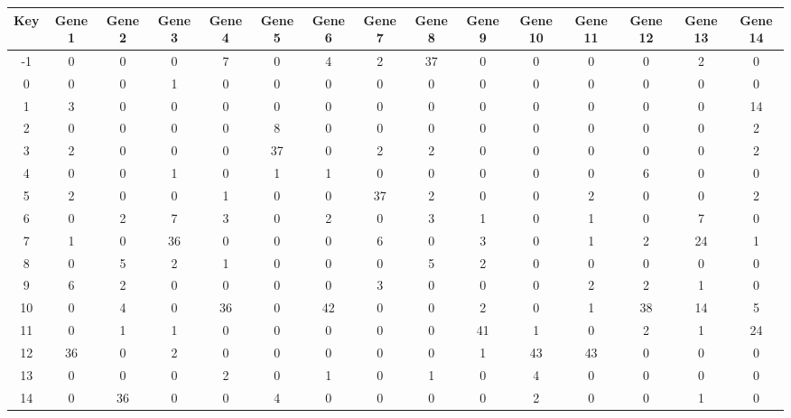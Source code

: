 \begin{tabular}{|c|c|c|c|c|c|c|c|c|c|c|c|c|c|c|}
\hline
Key & Gene 1 & Gene 2 & Gene 3 & Gene 4 & Gene 5 & Gene 6 & Gene 7 & Gene 8 & Gene 9 & Gene 10 & Gene 11 & Gene 12 & Gene 13 & Gene 14 \\
\hline
-1 & 0 & 0 & 0 & 7 & 0 & 4 & 2 & 37 & 0 & 0 & 0 & 0 & 2 & 0 \\
0 & 0 & 0 & 1 & 0 & 0 & 0 & 0 & 0 & 0 & 0 & 0 & 0 & 0 & 0 \\
1 & 3 & 0 & 0 & 0 & 0 & 0 & 0 & 0 & 0 & 0 & 0 & 0 & 0 & 14 \\
2 & 0 & 0 & 0 & 0 & 8 & 0 & 0 & 0 & 0 & 0 & 0 & 0 & 0 & 2 \\
3 & 2 & 0 & 0 & 0 & 37 & 0 & 2 & 2 & 0 & 0 & 0 & 0 & 0 & 2 \\
4 & 0 & 0 & 1 & 0 & 1 & 1 & 0 & 0 & 0 & 0 & 0 & 6 & 0 & 0 \\
5 & 2 & 0 & 0 & 1 & 0 & 0 & 37 & 2 & 0 & 0 & 2 & 0 & 0 & 2 \\
6 & 0 & 2 & 7 & 3 & 0 & 2 & 0 & 3 & 1 & 0 & 1 & 0 & 7 & 0 \\
7 & 1 & 0 & 36 & 0 & 0 & 0 & 6 & 0 & 3 & 0 & 1 & 2 & 24 & 1 \\
8 & 0 & 5 & 2 & 1 & 0 & 0 & 0 & 5 & 2 & 0 & 0 & 0 & 0 & 0 \\
9 & 6 & 2 & 0 & 0 & 0 & 0 & 3 & 0 & 0 & 0 & 2 & 2 & 1 & 0 \\
10 & 0 & 4 & 0 & 36 & 0 & 42 & 0 & 0 & 2 & 0 & 1 & 38 & 14 & 5 \\
11 & 0 & 1 & 1 & 0 & 0 & 0 & 0 & 0 & 41 & 1 & 0 & 2 & 1 & 24 \\
12 & 36 & 0 & 2 & 0 & 0 & 0 & 0 & 0 & 1 & 43 & 43 & 0 & 0 & 0 \\
13 & 0 & 0 & 0 & 2 & 0 & 1 & 0 & 1 & 0 & 4 & 0 & 0 & 0 & 0 \\
14 & 0 & 36 & 0 & 0 & 4 & 0 & 0 & 0 & 0 & 2 & 0 & 0 & 1 & 0 \\
\hline
\end{tabular}